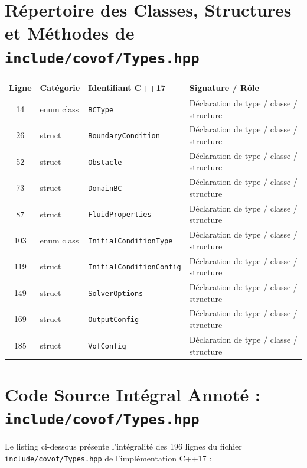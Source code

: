 \documentclass[10pt,a4paper,oneside]{book}
\begin{document}
\section{Répertoire des Classes, Structures et Méthodes de \texttt{include/covof/Types.hpp}}
\begin{center}\small
\begin{tabular}{clll}
\toprule
\textbf{Ligne} & \textbf{Catégorie} & \textbf{Identifiant C++17} & \textbf{Signature / Rôle} \\
\midrule
14 & enum class & \texttt{BCType} & Déclaration de type / classe / structure \\
26 & struct & \texttt{BoundaryCondition} & Déclaration de type / classe / structure \\
52 & struct & \texttt{Obstacle} & Déclaration de type / classe / structure \\
73 & struct & \texttt{DomainBC} & Déclaration de type / classe / structure \\
87 & struct & \texttt{FluidProperties} & Déclaration de type / classe / structure \\
103 & enum class & \texttt{InitialConditionType} & Déclaration de type / classe / structure \\
119 & struct & \texttt{InitialConditionConfig} & Déclaration de type / classe / structure \\
149 & struct & \texttt{SolverOptions} & Déclaration de type / classe / structure \\
169 & struct & \texttt{OutputConfig} & Déclaration de type / classe / structure \\
185 & struct & \texttt{VofConfig} & Déclaration de type / classe / structure \\
\bottomrule
\end{tabular}
\end{center}

\section{Code Source Intégral Annoté : \texttt{include/covof/Types.hpp}}
Le listing ci-dessous présente l'intégralité des 196 lignes du fichier \texttt{include/covof/Types.hpp} de l'implémentation C++17 :
\end{document}
